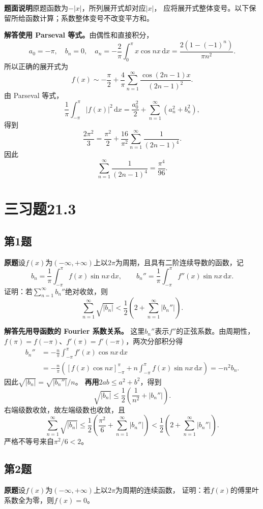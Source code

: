 \documentclass[11pt,a4paper]{ctexart}
\newcommand{\dd}{\,\mathrm d}
\newcommand{\problem}{\par\textbf{原题}\quad}
\newcommand{\solution}{\par\medskip\textbf{解答}\quad}
\begin{document}
\textbf{题面说明}\quad 原题函数为$-|x|$，所列展开式却对应$|x|$，
应将展开式整体变号。以下保留所给函数计算；系数整体变号不改变平方和。

\solution \textbf{使用 Parseval 等式。}由偶性和直接积分，
\[
a_0=-\pi,\quad b_n=0,\quad
a_n=-\frac2\pi\int_0^\pi x\cos nx\dd x
=\frac{2(1-(-1)^n)}{\pi n^2}.
\]
所以正确的展开式为
\[
f(x)\sim-\frac\pi2+\frac4\pi
\sum_{n=1}^{\infty}\frac{\cos(2n-1)x}{(2n-1)^2}.
\]
由 Parseval 等式，
\[
\frac1\pi\int_{-\pi}^{\pi}|f(x)|^2\dd x
=\frac{a_0^2}{2}+\sum_{n=1}^{\infty}(a_n^2+b_n^2),
\]
得到
\[
\frac{2\pi^2}{3}=\frac{\pi^2}{2}
+\frac{16}{\pi^2}\sum_{n=1}^{\infty}\frac1{(2n-1)^4}.
\]
因此
\[
\boxed{\displaystyle\sum_{n=1}^{\infty}\frac1{(2n-1)^4}
=\frac{\pi^4}{96}.}
\]

\newpage
\section*{三\quad 习题21.3}
\subsection*{第1题}
\problem 设$f(x)$为$(-\infty,+\infty)$上以$2\pi$为周期，且具有二阶连续导数的函数，记
\[
b_n=\frac1\pi\int_{-\pi}^{\pi}f(x)\sin nx\dd x,\qquad
b_n''=\frac1\pi\int_{-\pi}^{\pi}f''(x)\sin nx\dd x.
\]
证明：若$\sum_{n=1}^{\infty}b_n''$绝对收敛，则
\[
\sum_{n=1}^{\infty}\sqrt{|b_n|}
<\frac12\left(2+\sum_{n=1}^{\infty}|b_n''|\right).
\]

\solution \textbf{先用导函数的 Fourier 系数关系。}
这里$b_n''$表示$f''$的正弦系数。由周期性，
$f(\pi)=f(-\pi)$、$f'(\pi)=f'(-\pi)$，两次分部积分得
\begin{align*}
b_n''&=-\frac n\pi\int_{-\pi}^{\pi}f'(x)\cos nx\dd x\\
&=-\frac n\pi\left([f(x)\cos nx]_{-\pi}^{\pi}
+n\int_{-\pi}^{\pi}f(x)\sin nx\dd x\right)=-n^2b_n.
\end{align*}
因此$\sqrt{|b_n|}=\sqrt{|b_n''|}/n$。
\textbf{再用$2ab\le a^2+b^2$}，得到
\[
\sqrt{|b_n|}\le\frac12\left(\frac1{n^2}+|b_n''|\right).
\]
右端级数收敛，故左端级数也收敛，且
\[
\sum_{n=1}^{\infty}\sqrt{|b_n|}
\le\frac12\left(\frac{\pi^2}{6}+\sum_{n=1}^{\infty}|b_n''|\right)
<\frac12\left(2+\sum_{n=1}^{\infty}|b_n''|\right).
\]
严格不等号来自$\pi^2/6<2$。

\newpage
\subsection*{第2题}
\problem 设$f(x)$为$(-\infty,+\infty)$上以$2\pi$为周期的连续函数，
证明：若$f(x)$的傅里叶系数全为零，则$f(x)=0$。
\end{document}
